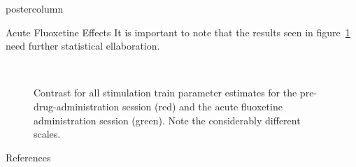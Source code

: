 \documentclass{beamer}
\begin{document}
\begin{frame}
\begin{columns}
\begin{column}{.57\textwidth}
\begin{beamercolorbox}[center]{postercolumn}
\begin{minipage}{.98\textwidth}
{\begin{myblock}{Acute Fluoxetine Effects}
						It is important to note that the results seen in figure~\ref{fig:fail} need further statistical ellaboration.
						\begin{figure}
							\begin{minipage}{0.85\textwidth}
								\centering%
\\%
								\caption{Contrast for all stimulation train parameter estimates for the pre-drug-administration session (red) and the acute fluoxetine administration session (green). Note the considerably different scales.}
								\label{fig:fail}
							\end{minipage}
						\end{figure}
					\end{myblock}\vfill
					\begin{myblock}{References}
						\footnotesize
                        \printbibliography[heading=bibliography,title=bibliography]
					\end{myblock}\vfill
		}\end{minipage}\end{beamercolorbox}
	\end{column}
\end{columns}
\end{frame}
\end{document}
